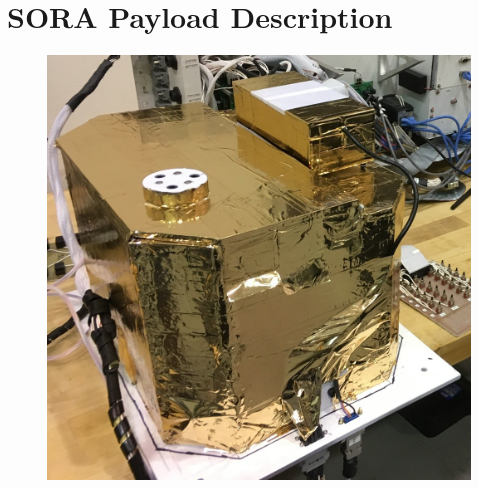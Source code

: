 \section{SORA Payload Description}
\label{sec:Hardware}


\begin{figure}[t]
  \begin{center}
    \begin{minipage}[c]{0.45\linewidth}
      \includegraphics[width=\textwidth]{./Figures/sora.JPG}
      \label{fig:payload} 
    \end{minipage}
    \hfill
    \begin{minipage}[c]{0.49\linewidth}

\end{minipage}
\end{center}
\end{figure}

